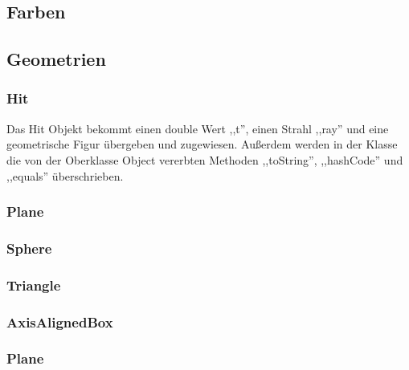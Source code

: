 \documentclass[14pt]{extarticle}
\begin{document}
\subsection{Farben}
\subsection{Geometrien}

\subsubsection{Hit}
Das Hit Objekt bekommt einen double Wert ,,t'', einen Strahl ,,ray'' und eine geometrische Figur übergeben und zugewiesen. Außerdem werden in der Klasse die von der Oberklasse Object vererbten Methoden ,,toString'', ,,hashCode'' und ,,equals'' überschrieben.
\subsubsection{Plane}
\subsubsection{Sphere}
\subsubsection{Triangle}
\subsubsection{AxisAlignedBox}
\subsubsection{Plane}
\end{document}
